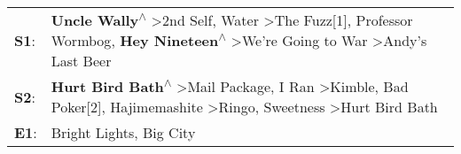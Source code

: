 \begin{supertabular}{p{0.03\textwidth}p{0.92\textwidth}}
 \textbf{S1}:  &      \textbf{Uncle Wally\textsuperscript{$\wedge$}} \textgreater \enspace 2nd Self\textsuperscript{}, \enspace Water\textsuperscript{} \textgreater \enspace The Fuzz[1]\textsuperscript{}, \enspace Professor Wormbog\textsuperscript{}, \enspace \textbf{Hey Nineteen\textsuperscript{$\wedge$}} \textgreater \enspace We're Going to War\textsuperscript{} \textgreater \enspace Andy's Last Beer\textsuperscript{}  \enspace  \\
 \textbf{S2}:  &  \textbf{Hurt Bird Bath\textsuperscript{$\wedge$}} \textgreater \enspace Mail Package\textsuperscript{}, \enspace I Ran\textsuperscript{} \textgreater \enspace Kimble\textsuperscript{}, \enspace Bad Poker[2]\textsuperscript{}, \enspace Hajimemashite\textsuperscript{} \textgreater \enspace Ringo\textsuperscript{}, \enspace Sweetness\textsuperscript{} \textgreater \enspace Hurt Bird Bath\textsuperscript{}  \enspace  \\
 \textbf{E1}:  &                                                                                                                                                                                                                                                                                                                                                                              Bright Lights, Big City\textsuperscript{}  \enspace  \\
\end{supertabular}
